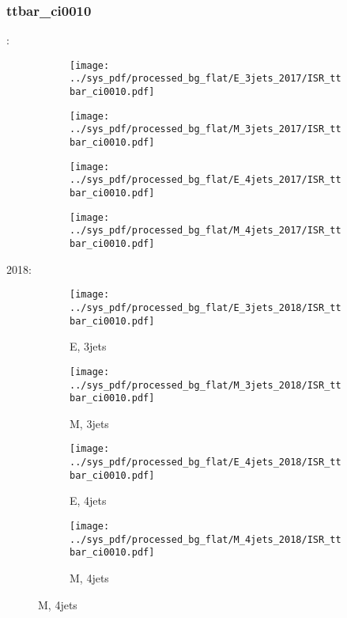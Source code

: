 \documentclass{beamer}
\begin{document}
\begin{frame}
\frametitle{ttbar_ci0010}
\fontsize{5}{1}:
\begin{figure}
\centering
\begin{subfigure}[b]{0.24\textwidth}
\texttt{[image: ../sys\_pdf/processed\_bg\_flat/E\_3jets\_2017/ISR\_ttbar\_ci0010.pdf]}
\end{subfigure}
\begin{subfigure}[b]{0.24\textwidth}
\texttt{[image: ../sys\_pdf/processed\_bg\_flat/M\_3jets\_2017/ISR\_ttbar\_ci0010.pdf]}
\end{subfigure}
\begin{subfigure}[b]{0.24\textwidth}
\texttt{[image: ../sys\_pdf/processed\_bg\_flat/E\_4jets\_2017/ISR\_ttbar\_ci0010.pdf]}
\end{subfigure}
\begin{subfigure}[b]{0.24\textwidth}
\texttt{[image: ../sys\_pdf/processed\_bg\_flat/M\_4jets\_2017/ISR\_ttbar\_ci0010.pdf]}
\end{subfigure}
\end{figure}
2018:
\begin{figure}
\centering
\begin{subfigure}[b]{0.24\textwidth}
\texttt{[image: ../sys\_pdf/processed\_bg\_flat/E\_3jets\_2018/ISR\_ttbar\_ci0010.pdf]}
\captionsetup{font=tiny}
\caption{E, 3jets}
\end{subfigure}
\begin{subfigure}[b]{0.24\textwidth}
\texttt{[image: ../sys\_pdf/processed\_bg\_flat/M\_3jets\_2018/ISR\_ttbar\_ci0010.pdf]}
\captionsetup{font=tiny}
\caption{M, 3jets}
\end{subfigure}
\begin{subfigure}[b]{0.24\textwidth}
\texttt{[image: ../sys\_pdf/processed\_bg\_flat/E\_4jets\_2018/ISR\_ttbar\_ci0010.pdf]}
\captionsetup{font=tiny}
\caption{E, 4jets}
\end{subfigure}
\begin{subfigure}[b]{0.24\textwidth}
\texttt{[image: ../sys\_pdf/processed\_bg\_flat/M\_4jets\_2018/ISR\_ttbar\_ci0010.pdf]}
\captionsetup{font=tiny}
\caption{M, 4jets}
\end{subfigure}
\end{figure}
\end{frame}
\end{document}
